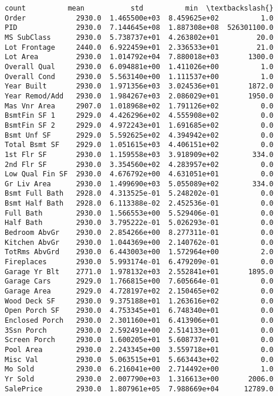 \documentclass[11pt]{article}
\makeatletter
\newcommand{\boxspacing}{\kern\kvtcb@left@rule\kern\kvtcb@boxsep}
\newcommand{\prompt}[4]{
        {\ttfamily\llap{{\color{#2}[#3]:\hspace{3pt}#4}}\vspace{-\baselineskip}}
    }
\makeatother
\begin{document}
            \begin{tcolorbox}[breakable, size=fbox, boxrule=.5pt, pad at break*=1mm, opacityfill=0]
\prompt{Out}{outcolor}{ }{\boxspacing}
\begin{Verbatim}[commandchars=\\\{\}]
                  count          mean           std          min  \textbackslash{}
Order            2930.0  1.465500e+03  8.459625e+02          1.0
PID              2930.0  7.144645e+08  1.887308e+08  526301100.0
MS SubClass      2930.0  5.738737e+01  4.263802e+01         20.0
Lot Frontage     2440.0  6.922459e+01  2.336533e+01         21.0
Lot Area         2930.0  1.014792e+04  7.880018e+03       1300.0
Overall Qual     2930.0  6.094881e+00  1.411026e+00          1.0
Overall Cond     2930.0  5.563140e+00  1.111537e+00          1.0
Year Built       2930.0  1.971356e+03  3.024536e+01       1872.0
Year Remod/Add   2930.0  1.984267e+03  2.086029e+01       1950.0
Mas Vnr Area     2907.0  1.018968e+02  1.791126e+02          0.0
BsmtFin SF 1     2929.0  4.426296e+02  4.555908e+02          0.0
BsmtFin SF 2     2929.0  4.972243e+01  1.691685e+02          0.0
Bsmt Unf SF      2929.0  5.592625e+02  4.394942e+02          0.0
Total Bsmt SF    2929.0  1.051615e+03  4.406151e+02          0.0
1st Flr SF       2930.0  1.159558e+03  3.918909e+02        334.0
2nd Flr SF       2930.0  3.354560e+02  4.283957e+02          0.0
Low Qual Fin SF  2930.0  4.676792e+00  4.631051e+01          0.0
Gr Liv Area      2930.0  1.499690e+03  5.055089e+02        334.0
Bsmt Full Bath   2928.0  4.313525e-01  5.248202e-01          0.0
Bsmt Half Bath   2928.0  6.113388e-02  2.452536e-01          0.0
Full Bath        2930.0  1.566553e+00  5.529406e-01          0.0
Half Bath        2930.0  3.795222e-01  5.026293e-01          0.0
Bedroom AbvGr    2930.0  2.854266e+00  8.277311e-01          0.0
Kitchen AbvGr    2930.0  1.044369e+00  2.140762e-01          0.0
TotRms AbvGrd    2930.0  6.443003e+00  1.572964e+00          2.0
Fireplaces       2930.0  5.993174e-01  6.479209e-01          0.0
Garage Yr Blt    2771.0  1.978132e+03  2.552841e+01       1895.0
Garage Cars      2929.0  1.766815e+00  7.605664e-01          0.0
Garage Area      2929.0  4.728197e+02  2.150465e+02          0.0
Wood Deck SF     2930.0  9.375188e+01  1.263616e+02          0.0
Open Porch SF    2930.0  4.753345e+01  6.748340e+01          0.0
Enclosed Porch   2930.0  2.301160e+01  6.413906e+01          0.0
3Ssn Porch       2930.0  2.592491e+00  2.514133e+01          0.0
Screen Porch     2930.0  1.600205e+01  5.608737e+01          0.0
Pool Area        2930.0  2.243345e+00  3.559718e+01          0.0
Misc Val         2930.0  5.063515e+01  5.663443e+02          0.0
Mo Sold          2930.0  6.216041e+00  2.714492e+00          1.0
Yr Sold          2930.0  2.007790e+03  1.316613e+00       2006.0
SalePrice        2930.0  1.807961e+05  7.988669e+04      12789.0


\end{Verbatim}
\end{tcolorbox}
\end{document}
